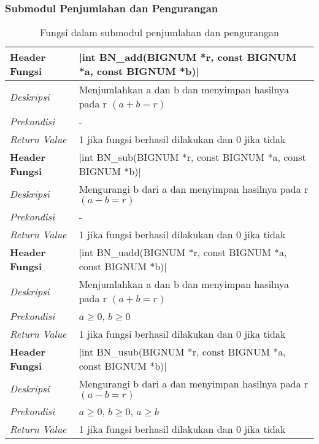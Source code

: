 
\subsubsection{Submodul Penjumlahan dan Pengurangan} \label{sec:impl_add}

  \begin{table}[!h]
     \small
  \caption{Fungsi dalam submodul penjumlahan dan pengurangan}
  \label{tab:bn_add_func}
  \begin{tabular}{R{2.8cm}L{10.5cm}}
    \toprule
    \textbf{Header Fungsi} & |int BN_add(BIGNUM *r, const BIGNUM *a, const BIGNUM *b)|    \\ \midrule
    \textit{Deskripsi}     & Menjumlahkan a dan b dan menyimpan hasilnya pada r $(a+b=r)$ \\
    \textit{Prekondisi}    & -                                                            \\
    \textit{Return Value}  & 1 jika fungsi berhasil dilakukan dan 0 jika tidak
    \\ \bottomrule
    \textbf{Header Fungsi} & |int BN_sub(BIGNUM *r, const BIGNUM *a, const BIGNUM *b)|    \\ \midrule
    \textit{Deskripsi}     & Mengurangi b dari a dan menyimpan hasilnya pada r $(a-b=r)$  \\
    \textit{Prekondisi}    & -                                                            \\
    \textit{Return Value}  & 1 jika fungsi berhasil dilakukan dan 0 jika tidak
    \\ \bottomrule
    \textbf{Header Fungsi} & |int BN_uadd(BIGNUM *r, const BIGNUM *a, const BIGNUM *b)|   \\ \midrule
    \textit{Deskripsi}     & Menjumlahkan a dan b dan menyimpan hasilnya pada r $(a+b=r)$ \\
    \textit{Prekondisi}    & $a \geq 0$, $ b \geq 0$                                      \\
    \textit{Return Value}  & 1 jika fungsi berhasil dilakukan dan 0 jika tidak
    \\ \bottomrule
    \textbf{Header Fungsi} & |int BN_usub(BIGNUM *r, const BIGNUM *a, const BIGNUM *b)|   \\ \midrule
    \textit{Deskripsi}     & Mengurangi b dari a dan menyimpan hasilnya pada r $(a-b=r)$  \\
    \textit{Prekondisi}    & $a \geq 0$, $b \geq 0$, $a \geq b$                           \\
    \textit{Return Value}  & 1 jika fungsi berhasil dilakukan dan 0 jika tidak
    \\ \bottomrule
  \end{tabular}
\end{table}

